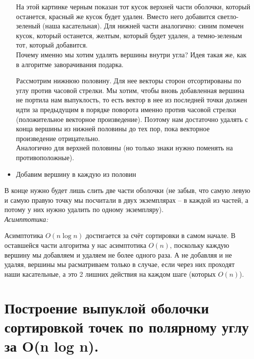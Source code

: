 \begin{itemize}
    На этой картинке черным показан тот кусок верхней части оболочки, который останется, красный же кусок будет удален. Вместо него добавится светло-зеленый (наша касательная).
    Для нижней части аналогично: синим помечен кусок, который останется, желтым, который будет удален, а темно-зеленым тот, который добавится.\\
    
    Почему именно мы хотим удалять вершины внутри угла? Идея такая же, как в алгоритме заворачивания подарка. 
    
    Рассмотрим нижнюю половину. Для нее векторы сторон отсортированы по углу против часовой стрелки. Мы хотим, чтобы вновь добавленная вершина не портила нам выпуклость, то есть вектор в нее из последней точки должен идти за предыдущим в порядке поворота именно против часовой стрелки (положительное векторное произведение). Поэтому нам достаточно удалять с конца вершины из нижней половины до тех пор, пока векторное произведение отрицательно.\\
    
    Аналогично для верхней половины (но только знаки нужно поменять на противоположные).
    
    \item Добавим вершину в каждую из половин

\end{itemize}
 
В конце нужно будет лишь слить две части оболочки (не забыв, что самую левую и самую правую точку мы посчитали в двух экземплярах -- в каждой из частей, а потому у них нужно удалить по одному экземпляру).\\

\textit{Асимптотика:}

Асимптотика $O(n\log n)$ достигается за счёт сортировки в самом начале. В оставшейся части алгоритма у нас асимптотика $O(n)$, поскольку каждую вершину мы добавляем и удаляем не более одного раза. А не добавляя и не удаляя, вершины мы расматриваем только в случае, если через них проходят наши касательные, а это 2 лишних действия на каждом шаге (которых $O(n)$).
\newpage{}

\section{Построение выпуклой оболочки сортировкой точек по полярному углу за O(n log n).}

